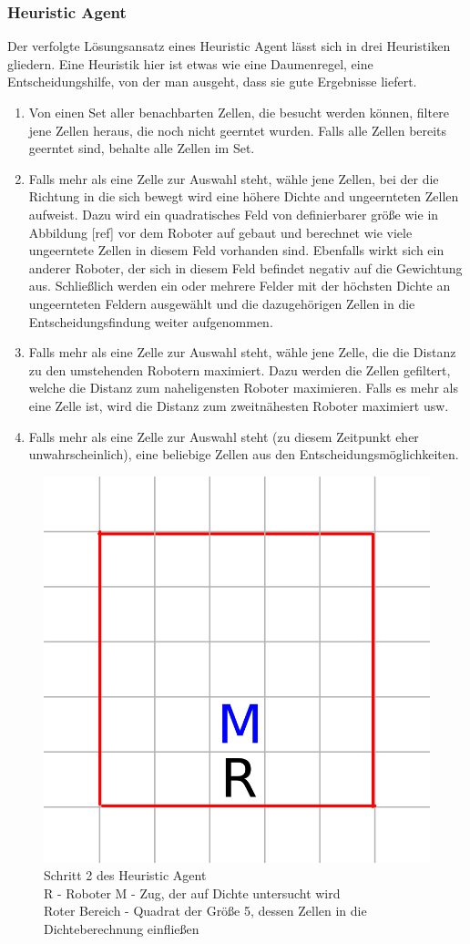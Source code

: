 \documentclass{article}
\begin{document}
\subsubsection{Heuristic Agent}
Der verfolgte Lösungsansatz eines Heuristic Agent lässt sich in drei Heuristiken 
gliedern. Eine Heuristik hier ist etwas wie eine Daumenregel, eine Entscheidungshilfe,
von der man ausgeht, dass sie gute Ergebnisse liefert.

\begin{enumerate}
\item Von einen Set aller benachbarten Zellen, die besucht werden können, filtere
jene Zellen heraus, die noch nicht geerntet wurden. Falls alle Zellen bereits
geerntet sind, behalte alle Zellen im Set.
\item Falls mehr als eine Zelle zur Auswahl steht, wähle jene Zellen, bei der die
Richtung in die sich bewegt wird eine höhere Dichte and ungeernteten Zellen
aufweist. Dazu wird ein quadratisches Feld von definierbarer größe wie in
Abbildung [ref] vor dem Roboter auf gebaut und berechnet wie viele ungeerntete
Zellen in diesem Feld vorhanden sind. Ebenfalls wirkt sich ein anderer Roboter,
der sich in diesem Feld befindet negativ auf die Gewichtung aus. Schließlich
werden ein oder mehrere Felder mit der höchsten Dichte an ungeernteten Feldern
ausgewählt und die dazugehörigen Zellen in die Entscheidungsfindung weiter
aufgenommen.
\item Falls mehr als eine Zelle zur Auswahl steht, wähle jene Zelle, die die
Distanz zu den umstehenden Robotern maximiert. Dazu werden die Zellen gefiltert,
welche die Distanz zum naheligensten Roboter maximieren. Falls es mehr als eine
Zelle ist, wird die Distanz zum zweitnähesten Roboter maximiert usw.
\item Falls mehr als eine Zelle zur Auswahl steht (zu diesem Zeitpunkt eher
unwahrscheinlich), eine beliebige Zellen aus den Entscheidungsmöglichkeiten.
\end{enumerate}

\begin{figure}
\includegraphics[width=.4\textwidth]{img/heuristic_density.png}
\centering
\caption{Schritt 2 des Heuristic Agent \\R - Roboter M - Zug, der auf Dichte untersucht wird \\ Roter Bereich - Quadrat der Größe 5, dessen Zellen in die Dichteberechnung einfließen}
\end{figure}
\end{document}
